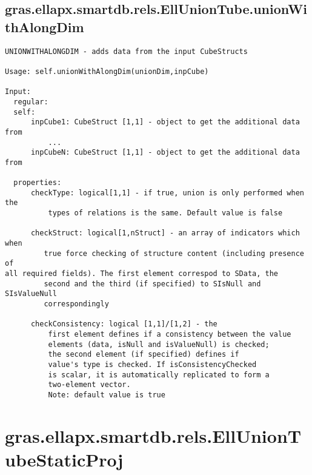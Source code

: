 \subsection{\texorpdfstring{gras.ellapx.smartdb.rels.EllUnionTube.unionWithAlongDim}{unionWithAlongDim}}\label{method:gras.ellapx.smartdb.rels.EllUnionTube.unionWithAlongDim}
\begin{verbatim}
UNIONWITHALONGDIM - adds data from the input CubeStructs

Usage: self.unionWithAlongDim(unionDim,inpCube)

Input:
  regular:
  self:
      inpCube1: CubeStruct [1,1] - object to get the additional data from
          ...
      inpCubeN: CubeStruct [1,1] - object to get the additional data from

  properties:
      checkType: logical[1,1] - if true, union is only performed when the
          types of relations is the same. Default value is false

      checkStruct: logical[1,nStruct] - an array of indicators which when
         true force checking of structure content (including presence of
all required fields). The first element correspod to SData, the
         second and the third (if specified) to SIsNull and SIsValueNull
         correspondingly

      checkConsistency: logical [1,1]/[1,2] - the
          first element defines if a consistency between the value
          elements (data, isNull and isValueNull) is checked;
          the second element (if specified) defines if
          value's type is checked. If isConsistencyChecked
          is scalar, it is automatically replicated to form a
          two-element vector.
          Note: default value is true
\end{verbatim}
\section{gras.ellapx.smartdb.rels.EllUnionTubeStaticProj}\label{secClassDescr:gras.ellapx.smartdb.rels.EllUnionTubeStaticProj}
